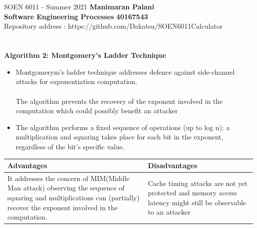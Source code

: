 \documentclass[a4paper, 11pt]{report}
\begin{document}
\section*{}
\normalsize {SOEN 6011 - Summer 2021} \hfill \textbf{Manimaran Palani} \\
\textbf{ Software Engineering Processes}  \hfill \textbf{40167543} \\
\hfill Repository address : https://github.com/Dakatsu/SOEN6011Calculator
\\
\textbf{\\ \\ Algorithm 2: Montgomery's Ladder Technique} 
\begin{itemize}
\item Montgomerym's ladder technique addresses defence against side-channel attacks for exponentiation computation. \\\\
The algorithm prevents the recovery of the exponent involved in the computation which could possibly benefit an attacker
\item The algorithm performs a fixed sequence of operations (up to log n): a multiplication and squaring takes place for each bit in the exponent, regardless of the bit's specific value.
\end{itemize}
\vspace*{0.2in}
\setlength{\tabcolsep}{18pt}
\renewcommand{\arraystretch}{1.5}
\begin{tabular}{ |p{6cm}|p{6cm}| }
\hline
\textbf{Advantages} & \textbf{Disadvantages}
\\ \hline 
It addresses the concern of MIM(Middle Man attack) observing the sequence of squaring and multiplications can (partially) recover the exponent involved in the computation. & Cache timing attacks are not yet protected and memory access latency might still be observable to an attacker\\
\hline
\end{tabular} 
\end{document}
